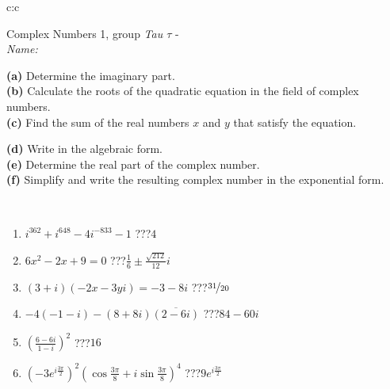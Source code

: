 \documentclass[10pt]{report}
\begin{document}
\begin{tabular}{c:c}
\begin{minipage}[c][104.5mm][t]{0.5\linewidth}
\begin{center}
\vspace{5mm}
{\huge Complex Numbers 1, group \textit{Tau $\tau$} -}\\[5mm]
\textit{Name:}\phantom{xxxxxxxxxxxxxxxxxxxxxxxxxxxxxxxxxxxxxxxxxxxxxxxxxxxxxxxxxxxxxxxxx}\\[5mm]
\begin{minipage}{0.95\linewidth}
\begin{center}
{\small \begin{minipage}{0.44\textwidth} \raggedright
\textbf{(a)} Determine the imaginary part. \\[1mm]
\textbf{(b)} Calculate the roots of the quadratic equation in the field of complex numbers. \\[1mm]
\textbf{(c)} Find the sum of the real numbers \(x\) and \(y\) that satisfy the equation. \end{minipage} \begin{minipage}{0.54\textwidth}
\textbf{(d)} Write in the algebraic form. \\[1mm]
\textbf{(e)} Determine the real part of the complex number. \\[1mm]
\textbf{(f)} Simplify and write the resulting complex number in the exponential form.
\end{minipage}
} \vspace{3mm}
\end{center}
\end{minipage}
\\[1mm]
\begin{minipage}{0.79\linewidth}
\begin{center}
\begin{varwidth}{\linewidth}
\setlength{\itemsep}{0pt}
\begin{enumerate}
\large
\item $i^{362}+i^{648}-4i^{-833}-1$\quad \dotfill\; ???\;\dotfill \quad $4$
\item $6x^2-2x+9=0$\quad \dotfill\; ???\;\dotfill \quad $\frac{1}{6} \pm{}\frac{ \sqrt{212}}{12}i$
\item $(3+i)(-2x-3yi)=-3-8i$\quad \dotfill\; ???\;\dotfill \quad $\nicefrac{31}{20}$
\item $-4(-1-i)-(8+8i)\overline{(2-6i)}$\quad \dotfill\; ???\;\dotfill \quad $84-60i$
\item $\left(\frac{6-6i}{1-i}\right)^2$\quad \dotfill\; ???\;\dotfill \quad $16$
\item $\left(-3e^{i\frac{3\pi}{2}}\right)^{2}\left(\cos{\frac{3\pi}{8}}+i\sin{\frac{3\pi}{8}}\right)^{4}$\quad \dotfill\; ???\;\dotfill \quad $9e^{i\frac{3\pi}{2}}$

\end{enumerate}
\end{varwidth}
\end{center}
\end{minipage}
\end{center}
\end{minipage}
\end{tabular}
\end{document}
